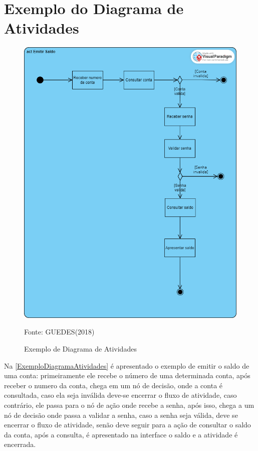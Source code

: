 \documentclass[12pt,openright,oneside,a4paper,
	chapter=TITLE,
	section=TITLE,
	english,brazil]{abntex2}
\begin{document}
\section{Exemplo do Diagrama de Atividades}

\begin{figure}[!htp]
	\caption{Exemplo de Diagrama de Atividades}
	\centering
	\includegraphics[scale=0.2]{img/ExemploDiagramaAtividades.png}
	\\
	\label{ExemploDiagramaAtividades}
	\footnotesize\raggedright Fonte: GUEDES(2018)
\end{figure}

Na \autoref{ExemploDiagramaAtividades} é apresentado o exemplo de emitir o saldo de uma conta: primeiramente ele recebe o número de uma determinada conta, após receber o numero da conta, chega em um nó de decisão, onde a conta é consultada, caso ela seja inválida deve-se encerrar o fluxo de atividade, caso contrário, ele passa para o nó de ação onde recebe a senha, após isso, chega a um nó de decisão onde passa a validar a senha, caso a senha seja válida, deve se encerrar o fluxo de atividade, senão deve seguir para a ação de consultar o saldo da conta, após a consulta, é apresentado na interface o saldo e a atividade é encerrada.
\end{document}
